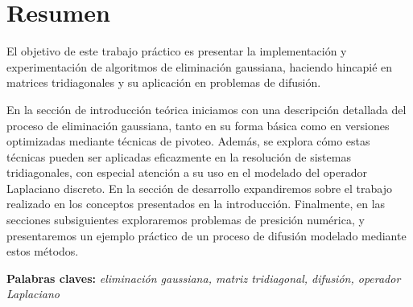 \section{Resumen}
El objetivo de este trabajo práctico es presentar la implementación y experimentación de algoritmos de eliminación gaussiana, haciendo hincapié en matrices tridiagonales y su aplicación en problemas de difusión. 

En la sección de introducción teórica iniciamos con una descripción detallada del proceso de eliminación gaussiana, tanto en su forma básica como en versiones optimizadas mediante técnicas de pivoteo. Además, se explora cómo estas técnicas pueden ser aplicadas eficazmente en la resolución de sistemas tridiagonales, con especial atención a su uso en el modelado del operador Laplaciano discreto. En la sección de desarrollo expandiremos sobre el trabajo realizado en los conceptos presentados en la introducción. Finalmente, en las secciones subsiguientes exploraremos problemas de presición numérica, y presentaremos un ejemplo práctico de un proceso de difusión modelado mediante estos métodos.

\textbf{Palabras claves:} \textit{eliminación gaussiana, matriz tridiagonal, difusión, operador Laplaciano}

